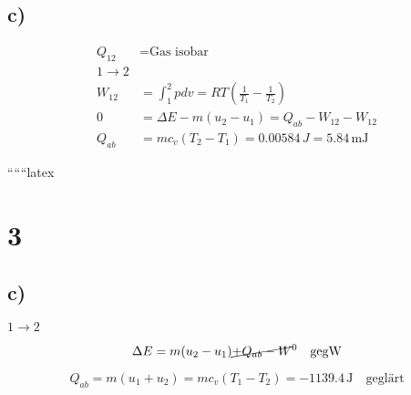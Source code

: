 

\subsection*{c)}
\begin{align*}
    Q_{12} &= \text{Gas isobar} \\
    1 \rightarrow 2 \\
    W_{12} &= \int_1^2 p dv = R T \left( \frac{1}{T_1} - \frac{1}{T_2} \right) \\
    0 &= \Delta E - m (u_2 - u_1) = Q_{ab} - W_{12} - W_{12} \\
    Q_{ab} &= m c_v (T_2 - T_1) = 0.00584 \, J = 5.84 \, \text{mJ}
\end{align*}

``````latex


\section*{3}



\subsection*{c)}
\(1 \rightarrow 2\)

\[
\Delta E = m(u_2 - u_1) \cancel{+ Q_{ab} - W}^0 \quad \text{gegW}
\]

\[
Q_{ab} = m(u_1 + u_2) = mc_v(T_1 - T_2) = -1139.4 \, \text{J} \quad \text{geglärt}
\]